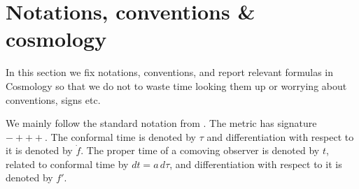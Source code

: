 \section{Notations, conventions \& cosmology}

In this section we fix notations, conventions, and report relevant formulas in Cosmology so that we do not to waste time looking them up or worrying about conventions, signs etc. 

We mainly follow the standard notation from \cite{MaBertschinger_CosmologicalPerturbationTheorySynchronousConformalNewtonianGauges_1995,Baumann_Cosmology_2022}.
The metric has signature $-+++$.
The conformal time is denoted by $\tau$ and differentiation with respect to it is denoted by $\dot{f}$.
The proper time of a comoving observer is denoted by $t$, related to conformal time by $dt=a \,d\tau$, and differentiation with respect to it is denoted by $f'$.

